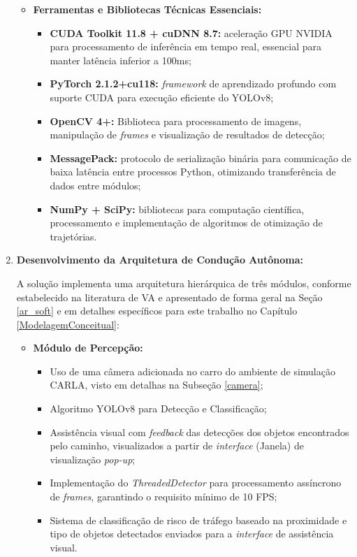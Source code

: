 \documentclass[
	12pt,				%
	oneside, %
	a4paper,			%
	english,			%
	french,				%
	spanish,			%
	brazil				%
	]{abntex2}
\begin{document}
\begin{enumerate}
\begin{itemize}
        \item \textbf{Ferramentas e Bibliotecas Técnicas Essenciais:}
            \begin{itemize}
            \item \textbf{CUDA Toolkit 11.8 + cuDNN 8.7:} aceleração GPU NVIDIA para processamento de inferência em tempo real, essencial para manter latência inferior a 100ms;
            \item \textbf{PyTorch 2.1.2+cu118:} \textit{framework} de aprendizado profundo com suporte CUDA para execução eficiente do YOLOv8;
            \item \textbf{OpenCV 4+:} Biblioteca para processamento de imagens, manipulação de \textit{frames} e visualização de resultados de detecção;
            \item \textbf{MessagePack:} protocolo de serialização binária para comunicação de baixa latência entre processos Python, otimizando transferência de dados entre módulos;
            \item \textbf{NumPy + SciPy:} bibliotecas para computação científica, processamento e implementação de algoritmos de otimização de trajetórias.
            \end{itemize}
    \end{itemize}
    
    \item \textbf{Desenvolvimento da Arquitetura de Condução Autônoma:}
    
    A solução implementa uma arquitetura hierárquica de três módulos, conforme estabelecido na literatura  de VA e apresentado de forma geral na Seção \ref{ar_soft} e em detalhes específicos para este trabalho no Capítulo \ref{ModelagemConceitual}:
    
    \begin{itemize}
    \item \textbf{Módulo de Percepção:}
        \begin{itemize}
        \item Uso de uma câmera adicionada no carro do ambiente de simulação CARLA, visto em detalhas na Subseção \ref{camera};
        \item Algoritmo YOLOv8 para Detecção e Classificação; %

        \item Assistência visual com \textit{feedback} das detecções dos objetos encontrados pelo caminho, visualizados a partir de \textit{interface} (Janela) de visualização \textit{pop-up}; 
        \item Implementação do \textit{ThreadedDetector} para processamento assíncrono de \textit{frames}, garantindo o requisito mínimo de 10 FPS;
        \item Sistema de classificação de risco de tráfego baseado na proximidade e tipo de objetos detectados enviados para a \textit{interface} de assistência visual.
        \end{itemize}
        

\end{itemize}
\end{enumerate}
\end{document}
